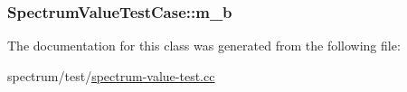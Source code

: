 \subsubsection[{\texorpdfstring{m\+\_\+b}{m_b}}]{ Spectrum\+Value\+Test\+Case\+::m\+\_\+b\hspace{0.3cm}{\ttfamily [private]}}\hypertarget{classSpectrumValueTestCase_a5482ae2981fb74b78bbd88bc690c43c7}{}\label{classSpectrumValueTestCase_a5482ae2981fb74b78bbd88bc690c43c7}


The documentation for this class was generated from the following file\+:\begin{DoxyCompactItemize}
\item 
spectrum/test/\hyperlink{spectrum-value-test_8cc}{spectrum-\/value-\/test.\+cc}\end{DoxyCompactItemize}
